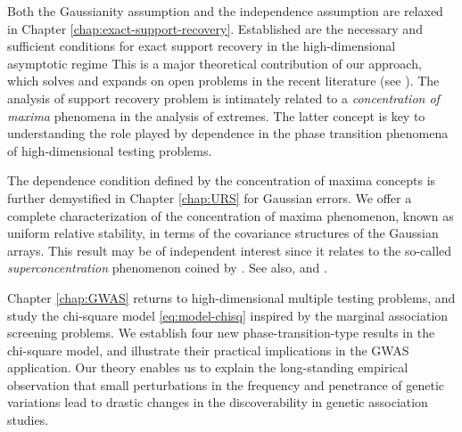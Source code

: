 Both the Gaussianity assumption and the independence assumption are relaxed in Chapter \ref{chap:exact-support-recovery}.
Established are the necessary and sufficient conditions for exact support recovery in the high-dimensional asymptotic regime 
This is a major theoretical contribution of our approach, which solves and expands on open problems in the recent literature 
(see \cite{butucea2018variable, gao2018fundamental}).
The analysis of support recovery problem is intimately related to a \emph{concentration of maxima} phenomena in the analysis of extremes.
The latter concept is key to understanding the role played by dependence in the phase transition phenomena of high-dimensional testing problems.

The dependence condition defined by the concentration of maxima  concepts is further demystified in Chapter \ref{chap:URS} for Gaussian errors.
We offer a complete characterization of the concentration of maxima phenomenon, known as uniform relative stability, in terms of the covariance structures of the Gaussian arrays.
This result may be of independent interest since it relates to the so-called \emph{superconcentration} phenomenon coined by \cite{chatterjee2014superconcentration}.
See also, \cite{gao2018fundamental} and \citet*{kartsioukas2019rate}.

Chapter \ref{chap:GWAS} returns to high-dimensional multiple testing problems, and study the chi-square model \eqref{eq:model-chisq} inspired by the marginal association screening problems.
We establish four new phase-transition-type results in the chi-square model, and illustrate their practical implications in the GWAS application.
Our theory enables us to explain the long-standing empirical observation that small perturbations in the frequency and penetrance of genetic variations lead to drastic changes in the discoverability in genetic association studies.



